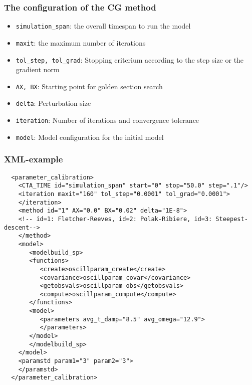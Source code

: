 \documentclass[a4paper,12pt]{article}
\begin{document}
\subsubsection{The configuration of the CG method}
\begin{itemize}
\item {\tt simulation\_span}: the overall timespan to run the model
\item {\tt maxit}: the maximum number of iterations
\item {\tt tol\_step, tol\_grad}: Stopping criterium  according to the step
  size or the gradient norm
\item {\tt AX, BX}: Starting point for golden section search
\item {\tt delta}: Perturbation size 
\item {\tt iteration}: Number of iterations and convergence tolerance
\item {\tt model}: Model configuration for the initial model
\end{itemize}

\subsubsection {XML-example}

   \begin{verbatim}
  <parameter_calibration>
    <CTA_TIME id="simulation_span" start="0" stop="50.0" step=".1"/>
    <iteration maxit="160" tol_step="0.0001" tol_grad="0.0001">
    </iteration>
    <method id="1" AX="0.0" BX="0.02" delta="1E-8">
    <!-- id=1: Fletcher-Reeves, id=2: Polak-Ribiere, id=3: Steepest-descent-->
    </method>
    <model>
       <modelbuild_sp>
       <functions>
          <create>oscillparam_create</create>
          <covariance>oscillparam_covar</covariance>
          <getobsvals>oscillparam_obs</getobsvals>
          <compute>oscillparam_compute</compute>
       </functions>
       <model>
          <parameters avg_t_damp="8.5" avg_omega="12.9">
          </parameters>
       </model>
       </modelbuild_sp>
    </model>
    <paramstd param1="3" param2="3">
    </paramstd>
  </parameter_calibration>
   \end{verbatim}
\end{document}

